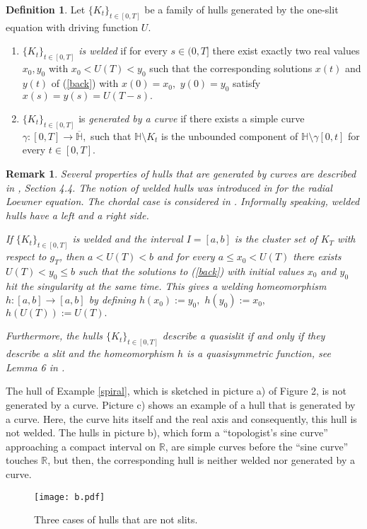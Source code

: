 \documentclass[11pt]{amsart}
\numberwithin{equation}{section}
\theoremstyle{plain}
\newtheorem{remark}[theorem]{Remark}
\theoremstyle{definition}
\newtheorem{definition}[theorem]{Definition}
\begin{document}
\begin{definition} 
Let $\{K_t\}_{t\in[0,T]}$ be a family of hulls generated by the one-slit equation with driving function $U$.
\begin{enumerate}
 \item[(1)] $\{K_t\}_{t\in[0,T]}$ \emph{is welded} if for every $s\in(0,T]$ there exist exactly two real values $x_0,y_0$ with $x_0<U(T)<y_0$ such that the corresponding solutions $x(t)$ and $y(t)$ of (\ref{back}) with $x(0)=x_0,$ $y(0)=y_0$ satisfy $x(s)=y(s)=U(T-s).$\\[-0.2cm]
\item[(2)] $\{K_t\}_{t\in[0,T]}$ is \emph{generated by a curve} if there exists a simple curve $\gamma:[0,T]\to\overline{\mathbb H},$ such that ${\mathbb H}\setminus K_t$ is the unbounded component of ${\mathbb H}\setminus \gamma[0,t]$ for every $t\in[0,T].$

\end{enumerate}
\end{definition}

\begin{remark}
 Several properties of hulls that are generated by curves are described in \cite{Lawler:2005}, Section 4.4. The notion of welded hulls was introduced in \cite{MarshallRohde:2005} for the radial Loewner equation. The chordal case is considered in \cite{Lind:2005}. Informally speaking, welded hulls have a left and a right side.

If $\{K_t\}_{t\in[0,T]}$ is welded and the interval $I=[a,b]$ is the cluster set of $K_T$ with respect to $g_T$, then $a<U(T)<b$ and for every $a\leq x_0<U(T)$ there exists $U(T)<y_0\leq b$ such that the solutions to (\ref{back}) with initial values $x_0$ and $y_0$ hit the singularity at the same time. This gives a welding homeomorphism $h:[a,b]\to[a,b]$ by defining $h(x_0):=y_0,$ $h(y_0):=x_0,$ $h(U(T)):=U(T).$

Furthermore, the hulls $\{K_t\}_{t\in[0,T]}$ describe a quasislit if and only if they describe a slit and the homeomorphism $h$ is a quasisymmetric function, see Lemma 6 in \cite{Lind:2005}.
\end{remark}

The hull of Example \ref{spiral}, which is sketched in picture a) of Figure 2, is not generated by a curve. Picture c) shows an  example of a hull that is generated by a curve. Here, the curve hits itself and the real axis and consequently, this hull is not welded. The hulls in picture b), which form a ``topologist's sine curve'' approaching a compact interval on ${\mathbb R}$, are simple curves before the ``sine curve'' touches ${\mathbb R}$, but then, the corresponding hull is neither welded nor generated by a curve. 
\begin{figure}[h]
 \centering \texttt{[image: b.pdf]}
\caption{Three cases of hulls that are not slits.}
\end{figure}
\end{document}
